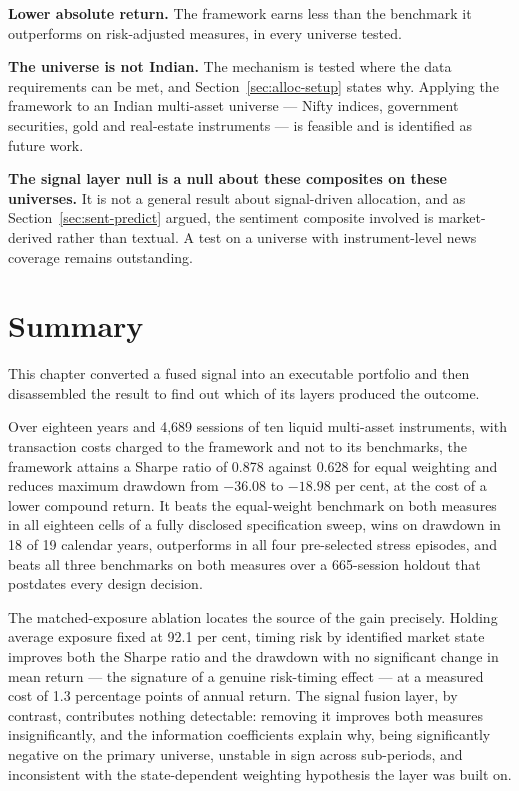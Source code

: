 \textbf{Lower absolute return.} The framework earns less than the benchmark it outperforms on
risk-adjusted measures, in every universe tested.

\textbf{The universe is not Indian.} The mechanism is tested where the data requirements can be
met, and Section~\ref{sec:alloc-setup} states why. Applying the framework to an Indian multi-asset
universe --- Nifty indices, government securities, gold and real-estate instruments --- is
feasible and is identified as future work.

\textbf{The signal layer null is a null about these composites on these universes.} It is not a
general result about signal-driven allocation, and as Section~\ref{sec:sent-predict} argued, the
sentiment composite involved is market-derived rather than textual. A test on a universe with
instrument-level news coverage remains outstanding.

\section{Summary}

This chapter converted a fused signal into an executable portfolio and then disassembled the
result to find out which of its layers produced the outcome.

Over eighteen years and 4,689 sessions of ten liquid multi-asset instruments, with transaction
costs charged to the framework and not to its benchmarks, the framework attains a Sharpe ratio of
0.878 against 0.628 for equal weighting and reduces maximum drawdown from $-36.08$ to $-18.98$ per
cent, at the cost of a lower compound return. It beats the equal-weight benchmark on both measures
in all eighteen cells of a fully disclosed specification sweep, wins on drawdown in 18 of 19
calendar years, outperforms in all four pre-selected stress episodes, and beats all three
benchmarks on both measures over a 665-session holdout that postdates every design decision.

The matched-exposure ablation locates the source of the gain precisely. Holding average exposure
fixed at 92.1 per cent, timing risk by identified market state improves both the Sharpe ratio and
the drawdown with no significant change in mean return --- the signature of a genuine risk-timing
effect --- at a measured cost of 1.3 percentage points of annual return. The signal fusion layer,
by contrast, contributes nothing detectable: removing it improves both measures insignificantly,
and the information coefficients explain why, being significantly negative on the primary universe,
unstable in sign across sub-periods, and inconsistent with the state-dependent weighting hypothesis
the layer was built on.

